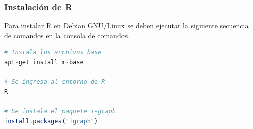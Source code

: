 \documentclass[12pt]{article}
\begin{document}
		\subsubsection{Instalación de R}
		
	Para instalar R en Debian GNU/Linux se deben ejecutar la siguiente secuencia de comandos en la consola de comandos.
	
\begin{lstlisting}[breaklines=true, 
				   language=R, 
				   title=asd, 
				   caption=Instalacion de R, 
				   label=fig:instalar_R]
# Instala los archivos base
apt-get install r-base	

# Se ingresa al entorno de R
R

# Se instala el paquete i-graph
install.packages("igraph")

\end{lstlisting}

    
\end{document}
